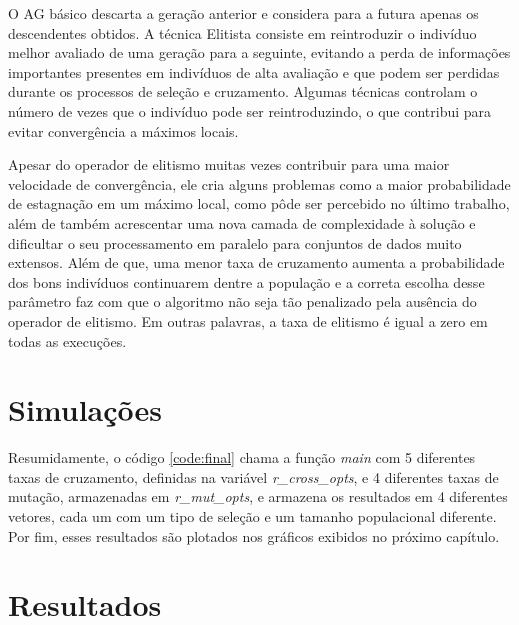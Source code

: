 \documentclass[12pt]{article}
\begin{document}
\begin{quoting}[rightmargin=0cm,leftmargin=4cm]
\begin{singlespace}
{\footnotesize 
O AG básico descarta a geração anterior e considera para a futura apenas os descendentes obtidos. A técnica Elitista consiste em reintroduzir o indivíduo melhor avaliado de uma geração para a seguinte, evitando a perda de informações importantes presentes em indivíduos de alta avaliação e que podem ser perdidas durante os processos de seleção e cruzamento. Algumas técnicas controlam o número de vezes que o indivíduo pode ser reintroduzindo, o que contribui para evitar convergência a máximos locais. \cite[p. 6]{bento_algoritmos_2008}
}
\end{singlespace}
\end{quoting}

Apesar do operador de elitismo muitas vezes contribuir para uma maior velocidade de convergência, ele cria alguns problemas como a maior probabilidade de estagnação em um máximo local, como pôde ser percebido no último trabalho, além de também acrescentar uma nova camada de complexidade à solução e dificultar o seu processamento em paralelo para conjuntos de dados muito extensos. Além de que, uma menor taxa de cruzamento aumenta a probabilidade dos bons indivíduos continuarem dentre a população e a correta escolha desse parâmetro faz com que o algoritmo não seja tão penalizado pela ausência do operador de elitismo. Em outras palavras, a taxa de elitismo é igual a zero em todas as execuções.

\section{Simulações}



Resumidamente, o código \ref{code:final} chama a função \textit{main} com 5 diferentes taxas de cruzamento, definidas na variável \textit{r\_cross\_opts}, e 4 diferentes taxas de mutação, armazenadas em \textit{r\_mut\_opts}, e armazena os resultados em 4 diferentes vetores, cada um com um tipo de seleção e um tamanho populacional diferente. Por fim, esses resultados são plotados nos gráficos exibidos no próximo capítulo.

\section{Resultados}
\end{document}
